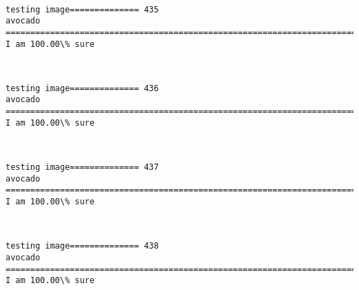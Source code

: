 \documentclass[11pt]{article}
\begin{document}
    \begin{center}
    \end{center}
    { \hspace*{\fill} \\}
    
    \begin{Verbatim}[commandchars=\\\{\}]
testing image============== 435
avocado
============================================================================
I am 100.00\% sure

    \end{Verbatim}

    \begin{center}
    \end{center}
    { \hspace*{\fill} \\}
    
    \begin{Verbatim}[commandchars=\\\{\}]
testing image============== 436
avocado
============================================================================
I am 100.00\% sure

    \end{Verbatim}

    \begin{center}
    \end{center}
    { \hspace*{\fill} \\}
    
    \begin{Verbatim}[commandchars=\\\{\}]
testing image============== 437
avocado
============================================================================
I am 100.00\% sure

    \end{Verbatim}

    \begin{center}
    \end{center}
    { \hspace*{\fill} \\}
    
    \begin{Verbatim}[commandchars=\\\{\}]
testing image============== 438
avocado
============================================================================
I am 100.00\% sure

    \end{Verbatim}
\end{document}

